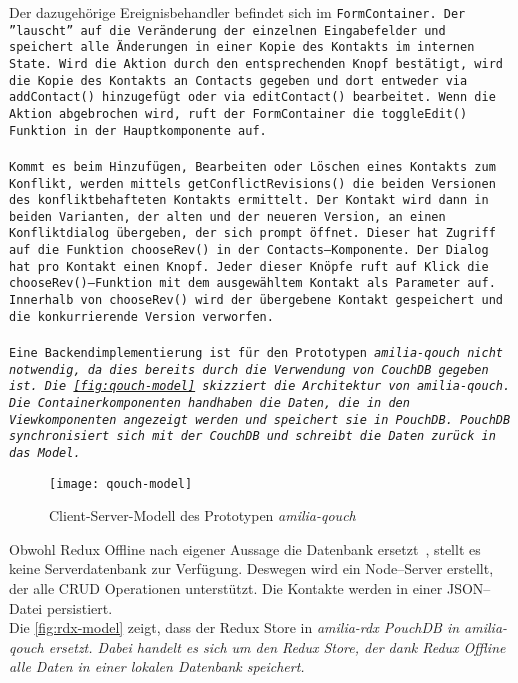 Der dazugehörige Ereignisbehandler befindet sich im \tt{FormContainer}. 
Der ''lauscht'' auf die Veränderung der einzelnen Eingabefelder und speichert alle Änderungen in einer Kopie des Kontakts im internen State.
Wird die Aktion durch den entsprechenden Knopf bestätigt, wird die Kopie des Kontakts an \tt{Contacts} gegeben und dort entweder via \tt{addContact()} hinzugefügt oder via \tt{editContact()} bearbeitet.
Wenn die Aktion abgebrochen wird, ruft der \tt{FormContainer} die \tt{toggleEdit()} Funktion in der Hauptkomponente auf.\\\\
%
%
Kommt es beim Hinzufügen, Bearbeiten oder Löschen eines Kontakts zum Konflikt, werden mittels \tt{getConflictRevisions()} die beiden Versionen des konfliktbehafteten Kontakts ermittelt.
Der Kontakt wird dann in beiden Varianten, der alten und der neueren Version, an einen Konfliktdialog übergeben, der sich prompt öffnet.
Dieser hat Zugriff auf die Funktion \tt{chooseRev()} in der \tt{Contacts}--Komponente.
Der Dialog hat pro Kontakt einen Knopf. Jeder dieser Knöpfe ruft auf Klick die \tt{chooseRev()}--Funktion mit dem ausgewähltem Kontakt als Parameter auf.
Innerhalb von \tt{chooseRev()} wird der übergebene Kontakt gespeichert und die konkurrierende Version verworfen.\\\\
%
%
Eine Backendimplementierung ist für den Prototypen \it{amilia-qouch} nicht notwendig, da dies bereits durch die Verwendung von CouchDB gegeben ist.
Die \autoref{fig:qouch-model} skizziert die Architektur von \it{amilia-qouch}.
Die Containerkomponenten handhaben die Daten, die in den Viewkomponenten angezeigt werden und speichert sie in PouchDB.
PouchDB synchronisiert sich mit der CouchDB und schreibt die Daten zurück in das Model.
\begin{figure}[H]
  \centering
  \texttt{[image: qouch-model]}
  \grayRule
  \caption{Client-Server-Modell des Prototypen \it{amilia-qouch}}
  \label{fig:qouch-model}
\end{figure}
%
Obwohl Redux Offline nach eigener Aussage die Datenbank ersetzt~\cite{redux-offline}, stellt es keine Serverdatenbank zur Verfügung.
Deswegen wird ein Node--Server erstellt, der alle \gls{CRUD} Operationen unterstützt.
Die Kontakte werden in einer \gls{JSON}--Datei persistiert.\\
Die \autoref{fig:rdx-model} zeigt, dass der Redux Store in \it{amilia-rdx} PouchDB in \it{amilia-qouch} ersetzt.
Dabei handelt es sich um den Redux Store, der dank Redux Offline alle Daten in einer lokalen Datenbank speichert.
